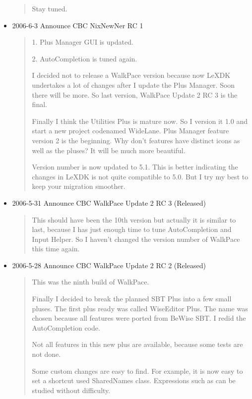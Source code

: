 \begin{itemize}
\begin{quotation}
    Stay tuned.
  \end{quotation}

  \item 2006-6-3 Announce CBC NixNewNer RC 1

  \begin{quotation}
    1. Plus Manager GUI is updated.

    2. AutoCompletion is tuned again.

    I decided not to release a WalkPace version because now LeXDK
    undertakes a lot of changes after I update the Plus Manager. Soon
    there will be more. So last version, WalkPace Update 2 RC 3 is the
    final.

    Finally I think the Utilities Plus is mature now. So I version it 1.0
    and start a new project codenamed WideLane. Plus Manager feature
    version 2 is the beginning. Why don't features have distinct icons as
    well as the pluses? It will be much more beautiful.

    Version number is now updated to 5.1. This is better indicating the
    changes in LeXDK is not quite compatible to 5.0. But I try my best to
    keep your migration smoother.
  \end{quotation}


  \item 2006-5-31 Announce CBC WalkPace Update 2 RC 3 (Released)

  \begin{quotation}
    This should have been the 10th version but actually it is similar to
    last, because I has just enough time to tune AutoCompletion and Input
    Helper. So I haven't changed the version number of WalkPace this time
    again.
  \end{quotation}

  \item 2006-5-28 Announce CBC WalkPace Update 2 RC 2 (Released)

  \begin{quotation}
    This was the ninth build of WalkPace.

    Finally I decided to break the planned SBT Plus into a few small
    pluses. The first plus ready was called WiseEditor Plus. The name was
    chosen because all features were ported from BeWise SBT. I redid the
    AutoCompletion code.

    Not all features in this new plus are available, because some tests
    are not done.

    Some custom changes are easy to find. For example, it is now easy to
    set a shortcut used SharedNames class. Expressions such as
     can be studied without difficulty.


\end{quotation}
\end{itemize}
